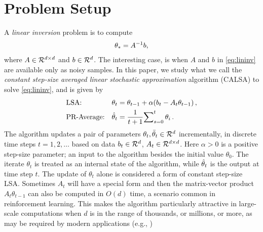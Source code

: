 \section{Problem Setup}\label{sec:prob}
A \emph{linear inversion} problem is to compute
\begin{align}\label{eq:lininv}
\theta_*=A^{-1}b,
\end{align}
where $A\in \mathcal{R}^{d \times d}$ and $b\in \mathcal{R}^{d}$. The interesting case, is when $A$ and $b$ in \eqref{eq:lininv} are available only as noisy samples. In this paper, we study what we call the \emph{constant step-size averaged linear stochastic approximation} algorithm (CALSA) to solve \eqref{eq:lininv}, and is given by
\begin{subequations}\label{eq:lsa}
\begin{align}
\label{conststep}&\text{LSA:} &\theta_t&=\theta_{t-1}+\alpha(b_t-A_t\theta_{t-1})\,,\\
\label{iteravg}&\text{PR-Average:} &\hat{\theta}_t&=\frac{1}{t+1}{\sum}_{s=0}^{t}\,\theta_i\,.
\end{align}
\end{subequations}
The algorithm updates a pair of parameters $\theta_t,\bar{\theta}_t\in \mathcal{R}^{d}$ incrementally, in discrete time steps $t=1,2,\dots$
based on data $b_t\in \mathcal{R}^d$, $A_t\in \mathcal{R}^{d \times d}$. Here $\alpha>0$ is a positive step-size parameter; an input to the algorithm besides the
initial value $\theta_0$. The iterate $\theta_t$ is treated as an internal state of the algorithm, while $\hat{\theta}_t$ is the output at time step $t$. The update of $\theta_t$ alone is considered a form of constant step-size LSA. Sometimes $A_t$ will have a special form and then the matrix-vector product $A_t \theta_{t-1}$ can also be computed in $O(d)$ time, a scenario common in reinforcement learning\cite{sutton,konda-tsitsiklis,gtd,gtd2,gtdmp}. This makes the algorithm particularly attractive in large-scale computations when $d$ is in the range of thousands, or millions, or more, as may be required by modern applications (e.g., \citep{LiMaTaBo16})
\begin{comment}
Note that the computation of $\theta_t$ can also be performed in an incremental fashion using $O(d)$ storage. 
Moreover, sometimes $A_t$ will have a special form and then the matrix-vector product $A_t \theta_{t-1}$ can also be computed in $O(d)$ time. This happens for example when $A_t$ is rank one.
When the data $(b_t,A_t)$ is sparse, further speedups are possible.
Examples of this kind arise in reinforcement learning \cite{sutton,konda-tsitsiklis,gtd,gtd2,gtdmp}, 
for details see \Cref{sec:related}.
The significance of efficient computation of the matrix-vector product is that an update of the algorithm
can then be implemented in $O(d)$ time (or less, in case of sparse data) and $O(d)$ storage, which makes the algorithm particularly attractive in large-scale computations when $d$ is in the range of thousands, or millions, or more, as may be required by modern applications (e.g., \citep{LiMaTaBo16})
\end{comment}

